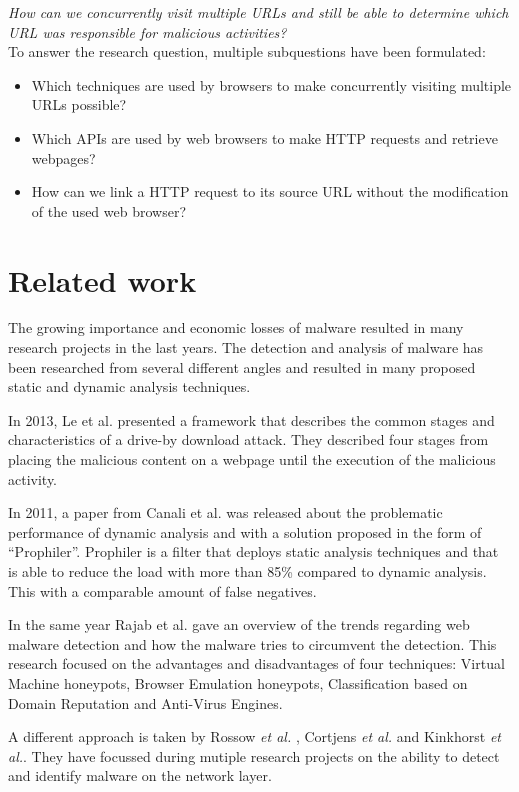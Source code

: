 \documentclass{scrartcl}
\begin{document}
\textit{How can we concurrently visit multiple URLs and still be able to determine which URL was responsible for malicious activities?}\\

To answer the research question, multiple subquestions have been formulated:
\begin{itemize}
\item Which techniques are used by browsers to make concurrently visiting multiple URLs possible?
\item Which APIs are used by web browsers to make HTTP requests and retrieve webpages?
\item How can we link a HTTP request to its source URL without the modification of the used web browser?
\end{itemize}

\section{Related work}
The growing importance and economic losses of malware resulted in many research projects in the last years. The detection and analysis of malware has been researched from several different angles \cite{auto_malware,Chang2013} and resulted in many proposed static and dynamic analysis techniques.

In 2013, Le et al. \cite{Le2013} presented a framework that describes the common stages and characteristics of a drive-by download attack. They described four stages from placing the malicious content on a webpage until the execution of the malicious activity.

In 2011, a paper from Canali et al. \cite{Canali2011} was released about the problematic performance of dynamic analysis and with a solution proposed in the form of ``Prophiler''. Prophiler is a filter that deploys static analysis techniques and that is able to reduce the load with more than 85\% compared to dynamic analysis. This with a comparable amount of false negatives.

In the same year Rajab et al. \cite{Rajab11trendsin} gave an overview of the trends regarding web malware detection and how the malware tries to circumvent the detection. This research focused on the advantages and disadvantages of four techniques: Virtual Machine honeypots, Browser Emulation honeypots, Classification based on Domain Reputation and Anti-Virus Engines.

A different approach is taken by Rossow \textit{et al.} \cite{Rossow2011}, Cortjens \textit{et al.} \cite{Cortjens2012} and Kinkhorst \textit{et al.}. They have focussed during mutiple research projects on the ability to detect and identify malware on the network layer.
\end{document}
